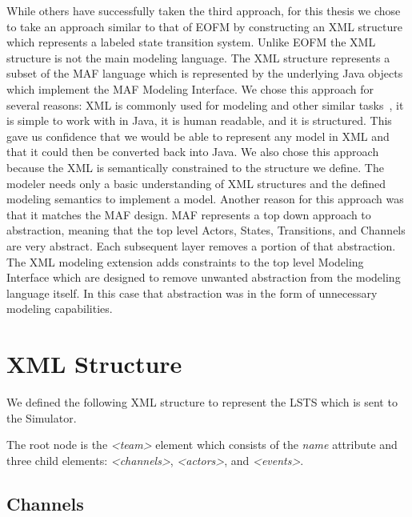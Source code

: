 While others have successfully taken the third approach, for this thesis we chose to take an approach similar to that of EOFM by constructing an XML structure which represents a labeled state transition system.  Unlike EOFM the XML structure is not the main modeling language.  The XML structure represents a subset of the MAF language which is represented by the underlying Java objects which implement the MAF Modeling Interface.  We chose this approach for several reasons:  XML is commonly used for modeling and other similar tasks~\cite{bolton2009enhanced}, it is simple to work with in Java, it is human readable, and it is structured.  This gave us confidence that we would be able to represent any model in XML and that it could then be converted back into Java.  We also chose this approach because the XML is semantically constrained to the structure we define.  The modeler needs only a basic understanding of XML structures and the defined modeling semantics to implement a model.  Another reason for this approach was that it matches the MAF design.  MAF represents a top down approach to abstraction, meaning that the top level Actors, States, Transitions, and Channels are very abstract.  Each subsequent layer removes a portion of that abstraction.  The XML modeling extension adds constraints to the top level Modeling Interface which are designed to remove unwanted abstraction from the modeling language itself.  In this case that abstraction was in the form of unnecessary modeling capabilities.

\section{XML Structure}

We defined the following XML structure to represent the LSTS which is sent to the Simulator.  

The root node is the {\em \textless team\textgreater} element which consists of the {\em name} attribute and three child elements: {\em \textless channels\textgreater}, {\em \textless actors\textgreater}, and {\em \textless events\textgreater}.

\begin{spacing}{.5}

\end{spacing}

\subsection{Channels}


